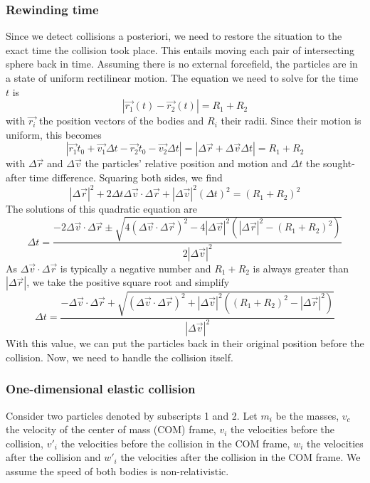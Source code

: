 \subsubsection{Rewinding time}
Since we detect collisions a posteriori, we need to restore the situation to 
the exact time the collision took place. This entails moving each pair of 
intersecting sphere back in time. Assuming there is no external forcefield, the 
particles are in a state of uniform rectilinear motion. The equation we need to 
solve for the time $t$ is
$$
|\vec{r_1}(t) - \vec{r_2}(t)| = R_1 + R_2
$$
with $\vec{r_i}$ the position vectors of the bodies and $R_i$ their radii.  
Since their motion is uniform, this becomes
$$
|\vec{r_1}{t_0} + \vec{v_1}\Delta t - \vec{r_2}{t_0} - \vec{v_2}\Delta t| = | 
\Delta\vec{r} + \Delta\vec{v} \Delta t | = R_1 + R_2
$$
with $\Delta\vec{r}$ and $\Delta\vec{v}$ the particles' relative position and 
motion and $\Delta t$ the sought-after time difference. Squaring both sides, we 
find
$$
|\Delta\vec{r}|^2 + 2\Delta t\Delta\vec{v} \cdot \Delta\vec{r} + 
|\Delta\vec{v}|^2(\Delta t)^2 = (R_1 + R_2)^2
$$
The solutions of this quadratic equation are
$$
\Delta t = \frac{-2\Delta\vec{v} \cdot \Delta\vec{r}
\pm \sqrt{4( \Delta\vec{v} \cdot \Delta\vec{r})^2 -
4|\Delta\vec{v}|^2 \left( |\Delta\vec{r}|^2 - (R_1 + R_2)^2 \right) }}
{2|\Delta\vec{v}|^2}
$$
As $\Delta\vec{v} \cdot \Delta\vec{r}$ is typically a negative number and 
$R_1 + R_2$ is always greater than $|\Delta\vec{r}|$, we take the positive 
square root and simplify
$$
\Delta t=\frac{-\Delta\vec{v} \cdot \Delta\vec{r} +
\sqrt{(\Delta\vec{v} \cdot \Delta\vec{r})^2 + |\Delta\vec{v}|^2
((R_1+R_2)^2 -|\Delta\vec{r}|^2)}}
{|\Delta\vec{v}|^2}
$$
With this value, we can put the particles back in their original position 
before the collision. Now, we need to handle the collision itself.

\subsubsection{One-dimensional elastic collision}

Consider two particles denoted by subscripts 1 and 2.  Let $m_i$ be the masses, 
$v_c$ the velocity of the center of mass (COM) frame, $v_i$ the velocities 
before the collision, $v'_i$ the velocities before the collision in the COM 
frame, $w_i$ the velocities after the collision and $w'_i$ the velocities after 
the collision in the COM frame.  We assume the speed of both bodies is 
non-relativistic. 

